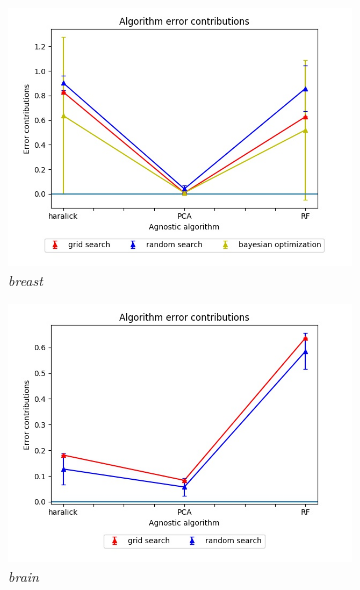 \begin{figure}[ht!]
\centering
\begin{subfigure}{.5\textwidth}
  \centering
  \includegraphics[scale=0.37]{img/EP/agnostic_error_alg_breast}
  \caption{\textit{breast}}
  \label{fig:sfig1}
\end{subfigure}%
\begin{subfigure}{.5\textwidth}
  \centering
  \includegraphics[scale=0.37]{img/EP/agnostic_error_alg_brain}
  \caption{\textit{brain}}
  \label{fig:sfig2}
\end{subfigure}
\begin{subfigure}{.5\textwidth}

\end{subfigure}
\end{figure}
